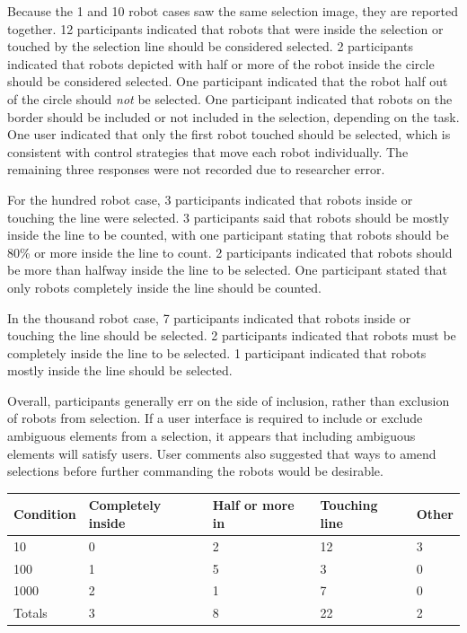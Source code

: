 Because the 1 and 10 robot cases saw the same selection image, they are reported together. 
12 participants indicated that robots that were inside the selection or touched by the selection line should be considered selected. 
2 participants indicated that robots depicted with half or more of the robot inside the circle should be considered selected. 
One participant indicated that the robot half out of the circle should \emph{not} be selected. 
One participant indicated that robots on the border should be included or not included in the selection, depending on the task. %
One user indicated that only the first robot touched should be selected, which is consistent with control strategies that move each robot individually. 
The remaining three responses were not recorded due to researcher error. 

For the hundred robot case, 3 participants indicated that robots inside or touching the line were selected. 
3 participants said that robots should be mostly inside the line to be counted, with one participant stating that robots should be 80\% or more inside the line to count. 
2 participants indicated that robots should be more than halfway inside the line to be selected. 
One participant stated that only robots completely inside the line should be counted. %

In the thousand robot case, 7 participants indicated that robots inside or touching the line should be selected. 
2 participants indicated that robots must be completely inside the line to be selected. 
1 participant indicated that robots mostly inside the line should be selected. 

Overall, participants generally err on the side of inclusion, rather than exclusion of robots from selection.
If a user interface is required to include or exclude ambiguous elements from a selection, it appears that including ambiguous elements will satisfy users. 
User comments also suggested that ways to amend selections before further commanding the robots would be desirable.

\begin{tabular}{ l l l l l}
	Condition & Completely inside & Half or more in & Touching line & Other\\
	\hline
	10 & 0 & 2 & 12 & 3 \\
	
	100 & 1 & 5 & 3 & 0 \\
	1000 & 2 & 1 & 7 & 0\\
	\hline
	Totals & 3 & 8 & 22 & 2 \\
\end{tabular}

